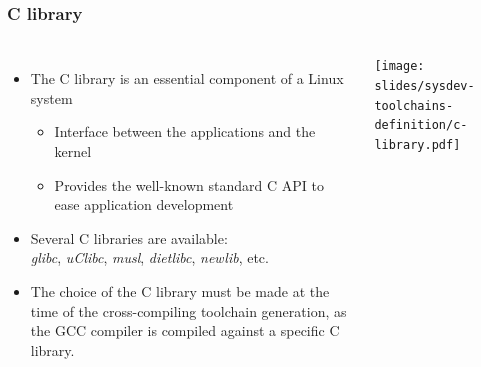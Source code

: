 \begin{frame}
  \frametitle{C library}
  \begin{columns}
    \begin{itemize}
    \item The C library is an essential component of a Linux system
      \begin{itemize}
      \item Interface between the applications and the kernel
      \item Provides the well-known standard C API to ease application
        development
      \end{itemize}
    \item Several C libraries are available:\\
      {\em glibc}, {\em uClibc}, {\em musl}, {\em dietlibc}, {\em
        newlib}, etc.
    \item The choice of the C library must be made at the time of the
      cross-compiling toolchain generation, as the GCC compiler is
      compiled against a specific C library.
    \end{itemize}
    \texttt{[image: slides/sysdev-toolchains-definition/c-library.pdf]}
  \end{columns}
\end{frame}
